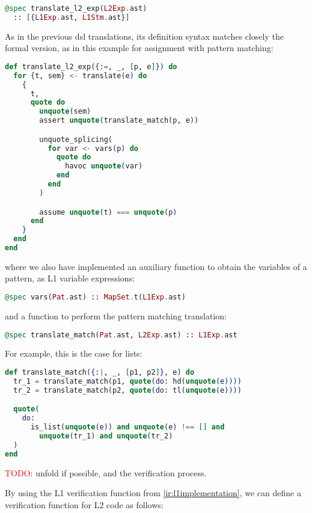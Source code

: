 \begin{lstlisting}[language=elixir,numbers=none,frame=none]
@spec translate_l2_exp(L2Exp.ast) 
  :: [{L1Exp.ast, L1Stm.ast}]
\end{lstlisting}

As in the previous \gls{dsl} translations, its definition syntax matches closely the 
formal version, as in this example for assignment with pattern matching:

\begin{lstlisting}[language=elixir,numbers=none,frame=none]
def translate_l2_exp({:=, _, [p, e]}) do
  for {t, sem} <- translate(e) do
    {
      t,
      quote do
        unquote(sem)
        assert unquote(translate_match(p, e))

        unquote_splicing(
          for var <- vars(p) do
            quote do
              havoc unquote(var)
            end
          end
        )

        assume unquote(t) === unquote(p)
      end
    }
  end
end
\end{lstlisting}

where we also have implemented an auxiliary function to obtain the variables of a 
pattern, as L1 variable expressions:

\begin{lstlisting}[language=elixir,numbers=none,frame=none]
@spec vars(Pat.ast) :: MapSet.t(L1Exp.ast)
\end{lstlisting}

and a function to perform the pattern matching translation:

\begin{lstlisting}[language=elixir,numbers=none,frame=none]
@spec translate_match(Pat.ast, L2Exp.ast) :: L1Exp.ast
\end{lstlisting}

For example, this is the case for lists:

\begin{lstlisting}[language=elixir,numbers=none,frame=none]
def translate_match({:|, _, [p1, p2]}, e) do
  tr_1 = translate_match(p1, quote(do: hd(unquote(e))))
  tr_2 = translate_match(p2, quote(do: tl(unquote(e))))

  quote(
    do:
      is_list(unquote(e)) and unquote(e) !== [] and
        unquote(tr_1) and unquote(tr_2)
  )
end
\end{lstlisting}

\textcolor{red}{TODO}: unfold if possible, and the verification process.

By using the L1 verification function from \ref{ir:l1implementation}, we can define 
a verification function for L2 code as follows:


